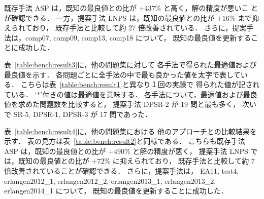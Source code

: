 既存手法 ASP は，既知の最良値との比が $+437\%$ と高く，解の精度が悪いこ
とが確認できる．
一方，提案手法 LNPS は，既知の最良値との比が $+16\%$ まで抑えられており，
既存手法と比較して約 27 倍改善されている．
さらに，提案手法は，comp07, comp09, comp13, comp18 について，
既知の最良値を更新することに成功した．

表~\ref{table:bench:result3}に，他の問題集に対して
各手法で得られた最適値および最良値を示す．
各問題ごとに全手法の中で最も良かった値を太字で表している．
こちらは表~\ref{table:bench:result1}と異なり１回の実験で
得られた値が記されている．
`$\ast$'付きの値は最適値を意味する．
各手法について，最適値および最良値を求めた問題数を比較すると，
提案手法 \textsf{DPSR-2} が 19 問と最も多く，
次いで \textsf{SR-5, DPSR-1, DPSR-3} が 17 問であった．

表~\ref{table:bench:result4}に，他の問題集における
他のアプローチとの比較結果を示す．
表の見方は表~\ref{table:bench:result2}と同様である．
こちらも既存手法 ASP は，既知の最良値との比が $+490\%$ と解の精度が悪く，
提案手法 LNPS では，既知の最良値との比が $+72\%$ に抑えられており，
既存手法と比較して約 7 倍改善されていることが確認できる．
さらに，提案手法は，
EA11, 
test4, 
erlangen2012\_1, 
erlangen2012\_2, 
erlangen2013\_1, 
erlangen2013\_2, 
erlangen2014\_1 について，
既知の最良値を更新することに成功した．



